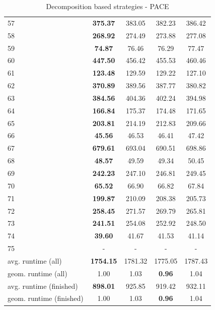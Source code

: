 \documentclass[a4paper,UKenglish,cleveref, autoref, thm-restate]{lipics-v2021}
\begin{document}
\begin{table}
\begin{center}
\begin{tabular}{|l|c|c|c|c|}
			57 & \textbf{375.37} & 383.05 & 382.23 & 386.42 \\
			58 & \textbf{268.92} & 274.49 & 273.88 & 277.08 \\
			59 & \textbf{74.87} & 76.46 & 76.29 & 77.47 \\
			60 & \textbf{447.50} & 456.42 & 455.53 & 460.46 \\
			61 & \textbf{123.48} & 129.59 & 129.22 & 127.10 \\
			62 & \textbf{370.89} & 389.56 & 387.77 & 380.82 \\
			63 & \textbf{384.56} & 404.36 & 402.24 & 394.98 \\
			64 & \textbf{166.84} & 175.37 & 174.48 & 171.65 \\
			65 & \textbf{203.81} & 214.19 & 212.83 & 209.66 \\
			66 & \textbf{45.56} & 46.53 & 46.41 & 47.42 \\
			67 & \textbf{679.61} & 693.04 & 690.51 & 698.86 \\
			68 & \textbf{48.57} & 49.59 & 49.34 & 50.45 \\
			69 & \textbf{242.23} & 247.10 & 246.81 & 249.45 \\
			70 & \textbf{65.52} & 66.90 & 66.82 & 67.84 \\
			71 & \textbf{199.87} & 210.09 & 208.38 & 205.73 \\
			72 & \textbf{258.45} & 271.57 & 269.79 & 265.81 \\
			73 & \textbf{241.51} & 254.08 & 252.92 & 248.50 \\
			74 & \textbf{39.60} & 41.67 & 41.53 & 41.14 \\
			75 & - & - & - & - \\
			\hline
			avg. runtime (all) & \textbf{1754.15} & 1781.32 & 1775.05 & 1787.43 \\
			geom. runtime (all) & 1.00 & 1.03 & \textbf{0.96} & 1.04 \\
			avg. runtime (finished) & \textbf{898.01} & 925.85 & 919.42 & 932.11 \\
			geom. runtime (finished) & 1.00 & 1.03 & \textbf{0.96} & 1.04 \\
			\hline			
		\end{tabular}
	\end{center}
	\caption{Decomposition based strategies - PACE}
\end{table}
\end{document}
